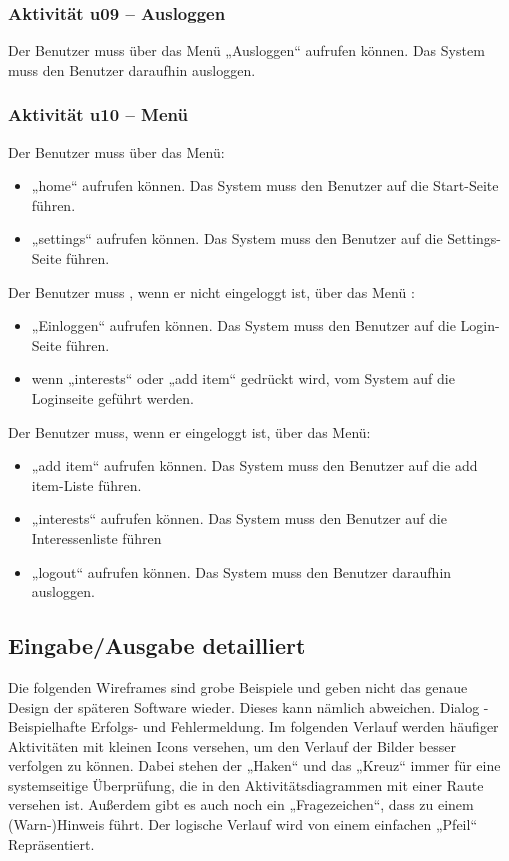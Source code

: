 \documentclass[a4paper,12pt,oneside]{scrartcl}
\begin{document}
\subsubsection{Aktivität u09 – Ausloggen}
Der Benutzer muss über das Menü „Ausloggen“ aufrufen können. Das System muss den Benutzer daraufhin ausloggen. 


\subsubsection{Aktivität u10 – Menü}
Der Benutzer muss über das Menü:
\begin{itemize}
	\item „home“ aufrufen können. Das System muss den Benutzer auf die Start-Seite führen.
	\item „settings“ aufrufen können. Das System muss den Benutzer auf die Settings-Seite führen.
\end{itemize}
Der Benutzer muss , wenn er nicht eingeloggt ist, über das Menü :
\begin{itemize}
	\item „Einloggen“ aufrufen können. Das System muss den Benutzer auf die Login-Seite führen.
	\item wenn „interests“ oder „add item“ gedrückt wird, vom System auf die Loginseite geführt werden.
\end{itemize}
Der Benutzer muss, wenn er eingeloggt ist, über das Menü:
\begin{itemize}
	\item „add item“ aufrufen können. Das System muss den Benutzer auf die add item-Liste führen.
	\item „interests“ aufrufen können. Das System muss den Benutzer auf die Interessenliste führen
	\item „logout“ aufrufen können. Das System muss den Benutzer daraufhin ausloggen. 
\end{itemize}


\subsection{Eingabe/Ausgabe detailliert}
Die folgenden Wireframes sind grobe Beispiele und geben nicht das genaue Design der späteren Software wieder. Dieses kann nämlich abweichen. 
Dialog - Beispielhafte Erfolgs- und Fehlermeldung. 
Im folgenden Verlauf werden häufiger Aktivitäten mit kleinen Icons versehen, um den Verlauf der Bilder besser verfolgen zu können. Dabei stehen der „Haken“ und das „Kreuz“ immer für eine systemseitige Überprüfung, die in den Aktivitätsdiagrammen mit einer Raute versehen ist. Außerdem gibt es auch noch ein „Fragezeichen“, dass zu einem (Warn-)Hinweis führt. Der logische Verlauf wird von einem einfachen „Pfeil“ Repräsentiert.  
\end{document}
